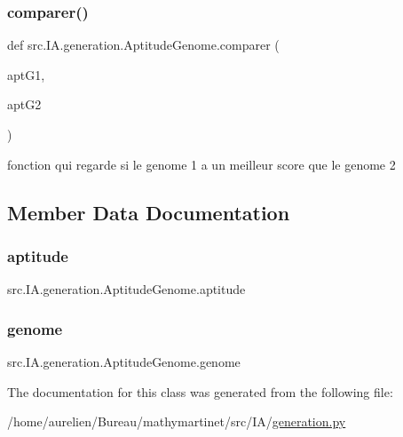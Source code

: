 \subsubsection{\texorpdfstring{comparer()}{comparer()}}
{\footnotesize\ttfamily def src.\+I\+A.\+generation.\+Aptitude\+Genome.\+comparer (\begin{DoxyParamCaption}\item[{}]{apt\+G1,  }\item[{}]{apt\+G2 }\end{DoxyParamCaption})\hspace{0.3cm}{\ttfamily [static]}}



fonction qui regarde si le genome 1 a un meilleur score que le genome 2 



\subsection{Member Data Documentation}
\mbox{\label{classsrc_1_1_i_a_1_1generation_1_1_aptitude_genome_a47dd54ce79c4991802651a85dc4c35e3}} 
\subsubsection{\texorpdfstring{aptitude}{aptitude}}
{\footnotesize\ttfamily src.\+I\+A.\+generation.\+Aptitude\+Genome.\+aptitude}

\mbox{\label{classsrc_1_1_i_a_1_1generation_1_1_aptitude_genome_adb2ea447f40cd23fa32ac81d0fa0749f}} 
\subsubsection{\texorpdfstring{genome}{genome}}
{\footnotesize\ttfamily src.\+I\+A.\+generation.\+Aptitude\+Genome.\+genome}



The documentation for this class was generated from the following file\+:\begin{DoxyCompactItemize}
\item 
/home/aurelien/\+Bureau/mathymartinet/src/\+I\+A/\hyperlink{generation_8py}{generation.\+py}\end{DoxyCompactItemize}
